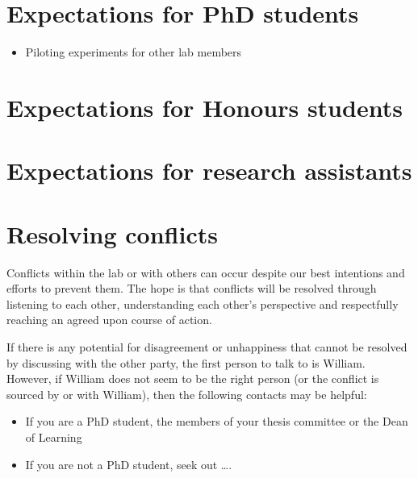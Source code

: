 \documentclass[
]{book}
\providecommand{\tightlist}{%
  \setlength{\itemsep}{0pt}\setlength{\parskip}{0pt}}
\theoremstyle{definition}
\theoremstyle{definition}
\theoremstyle{definition}
\theoremstyle{definition}
\theoremstyle{remark}
\begin{document}
\hypertarget{expectations-for-phd-students}{%
\section{Expectations for PhD students}\label{expectations-for-phd-students}}

\begin{itemize}
\tightlist
\item
  Piloting experiments for other lab members
\end{itemize}

\hypertarget{expectations-for-honours-students}{%
\section{Expectations for Honours students}\label{expectations-for-honours-students}}

\hypertarget{expectations-for-research-assistants}{%
\section{Expectations for research assistants}\label{expectations-for-research-assistants}}

\hypertarget{resolving-conflicts}{%
\section{Resolving conflicts}\label{resolving-conflicts}}

Conflicts within the lab or with others can occur despite our best intentions and efforts to prevent them. The hope is that conflicts will be resolved through listening to each other, understanding each other's perspective and respectfully reaching an agreed upon course of action.

If there is any potential for disagreement or unhappiness that cannot be resolved by discussing with the other party, the first person to talk to is William. However, if William does not seem to be the right person (or the conflict is sourced by or with William), then the following contacts may be helpful:

\begin{itemize}
\tightlist
\item
  If you are a PhD student, the members of your thesis committee or the Dean of Learning
\item
  If you are not a PhD student, seek out \ldots.
\end{itemize}
\end{document}
